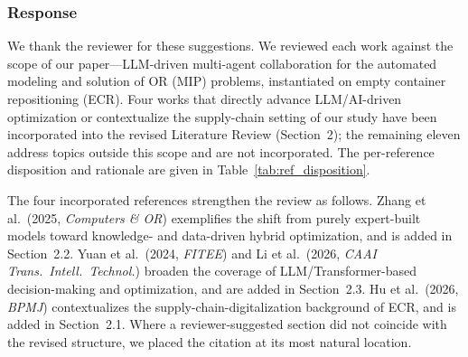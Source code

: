 \documentclass[11pt,a4paper]{article}
\begin{document}
\subsubsection{Response}
We thank the reviewer for these suggestions. We reviewed each work against the scope of our paper---LLM-driven multi-agent collaboration for the automated modeling and solution of OR (MIP) problems, instantiated on empty container repositioning (ECR). Four works that directly advance LLM/AI-driven optimization or contextualize the supply-chain setting of our study have been incorporated into the revised Literature Review (Section~2); the remaining eleven address topics outside this scope and are not incorporated. The per-reference disposition and rationale are given in Table~\ref{tab:ref_disposition}.

The four incorporated references strengthen the review as follows. Zhang et al.\ (2025, \emph{Computers \& OR}) exemplifies the shift from purely expert-built models toward knowledge- and data-driven hybrid optimization, and is added in Section~2.2. Yuan et al.\ (2024, \emph{FITEE}) and Li et al.\ (2026, \emph{CAAI Trans.\ Intell.\ Technol.}) broaden the coverage of LLM/Transformer-based decision-making and optimization, and are added in Section~2.3. Hu et al.\ (2026, \emph{BPMJ}) contextualizes the supply-chain-digitalization background of ECR, and is added in Section~2.1. Where a reviewer-suggested section did not coincide with the revised structure, we placed the citation at its most natural location.
\end{document}
